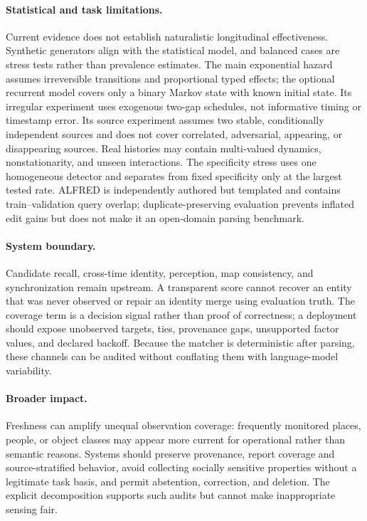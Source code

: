 \documentclass{article}
\begin{document}
\paragraph{Statistical and task limitations.}
Current evidence does not establish naturalistic longitudinal effectiveness. Synthetic generators align with the statistical model, and balanced cases are stress tests rather than prevalence estimates. The main exponential hazard assumes irreversible transitions and proportional typed effects; the optional recurrent model covers only a binary Markov state with known initial state. Its irregular experiment uses exogenous two-gap schedules, not informative timing or timestamp error. Its source experiment assumes two stable, conditionally independent sources and does not cover correlated, adversarial, appearing, or disappearing sources. Real histories may contain multi-valued dynamics, nonstationarity, and unseen interactions. The specificity stress uses one homogeneous detector and separates from fixed specificity only at the largest tested rate. ALFRED is independently authored but templated and contains train--validation query overlap; duplicate-preserving evaluation prevents inflated edit gains but does not make it an open-domain parsing benchmark.

\paragraph{System boundary.}
Candidate recall, cross-time identity, perception, map consistency, and synchronization remain upstream. A transparent score cannot recover an entity that was never observed or repair an identity merge using evaluation truth. The coverage term is a decision signal rather than proof of correctness; a deployment should expose unobserved targets, ties, provenance gaps, unsupported factor values, and declared backoff. Because the matcher is deterministic after parsing, these channels can be audited without conflating them with language-model variability.

\paragraph{Broader impact.}
Freshness can amplify unequal observation coverage: frequently monitored places, people, or object classes may appear more current for operational rather than semantic reasons. Systems should preserve provenance, report coverage and source-stratified behavior, avoid collecting socially sensitive properties without a legitimate task basis, and permit abstention, correction, and deletion. The explicit decomposition supports such audits but cannot make inappropriate sensing fair.
\end{document}
